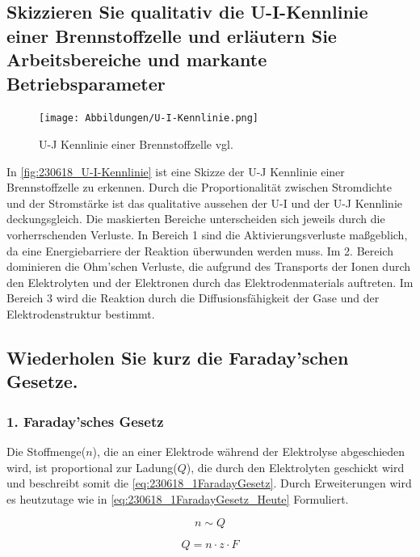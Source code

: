 \subsection{Skizzieren Sie qualitativ die U-I-Kennlinie einer Brennstoffzelle und erläutern Sie Arbeitsbereiche und markante Betriebsparameter}

\begin{figure}[H]
    \centering
    \texttt{[image: Abbildungen/U-I-Kennlinie.png]}
    \caption{U-J Kennlinie einer Brennstoffzelle vgl. \cite{BZ-Folien}}
    \label{fig:230618_U-I-Kennlinie}
\end{figure}

In \autoref{fig:230618_U-I-Kennlinie} ist eine Skizze der U-J Kennlinie einer Brennstoffzelle zu erkennen.
Durch die Proportionalität zwischen Stromdichte und der Stromstärke ist das qualitative aussehen der U-I und der U-J Kennlinie deckungsgleich.
Die maskierten Bereiche unterscheiden sich jeweils durch die vorherrschenden Verluste.
In Bereich 1 sind die Aktivierungsverluste maßgeblich, da eine Energiebarriere der Reaktion überwunden werden muss.
Im 2. Bereich dominieren die Ohm'schen Verluste, die aufgrund des Transports der Ionen durch den Elektrolyten und der Elektronen durch das Elektrodenmaterials auftreten.
Im Bereich 3 wird die Reaktion durch die Diffusionsfähigkeit der Gase und der Elektrodenstruktur bestimmt.

\subsection{Wiederholen Sie kurz die Faraday'schen Gesetze.}

\subsubsection{1. Faraday'sches Gesetz}

Die Stoffmenge($n$), die an einer Elektrode während der Elektrolyse abgeschieden wird, ist proportional zur Ladung($Q$), die durch den Elektrolyten geschickt wird \cite{Faraday_G} und beschreibt somit die \autoref{eq:230618_1FaradayGesetz}.
Durch Erweiterungen wird es heutzutage wie in \autoref{eq:230618_1FaradayGesetz_Heute} Formuliert.

\begin{equation}
    n \sim Q
    \label{eq:230618_1FaradayGesetz}
\end{equation}

\begin{equation}
    Q = n \cdot z \cdot F
    \label{eq:230618_1FaradayGesetz_Heute}
\end{equation}

